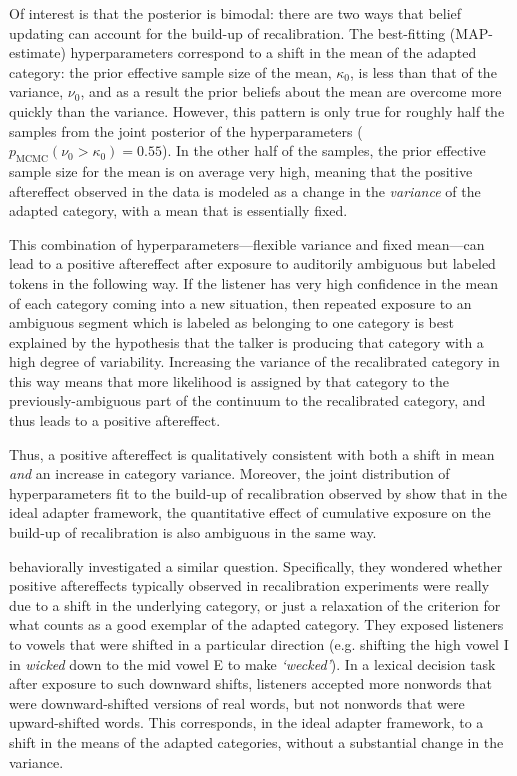 Of interest is that the posterior is bimodal: there are two ways that belief updating can account for the build-up of recalibration.  The best-fitting (MAP-estimate) hyperparameters correspond to a shift in the mean of the adapted category: the prior effective sample size of the mean, $\kappa_0$, is less than that of the variance, $\nu_0$, and as a result the prior beliefs about the mean are overcome more quickly than the variance.
However, this pattern is only true for roughly half the samples from the joint posterior of the hyperparameters ($p_\mathrm{MCMC}(\nu_0 > \kappa_0) = 0.55$).  In the other half of the samples, the prior effective sample size for the mean is on average very high, meaning that the positive aftereffect observed in the data is modeled as a change in the \emph{variance} of the adapted category, with a mean that is essentially fixed.

This combination of hyperparameters---flexible variance and fixed mean---can lead to a positive aftereffect after exposure to auditorily ambiguous but labeled tokens in the following way.  If the listener has very high confidence in the mean of each category coming into a new situation, then repeated exposure to an ambiguous segment which is labeled as belonging to one category is best explained by the hypothesis that the talker is producing that category with a high degree of variability.  Increasing the variance of the recalibrated category in this way means that more likelihood is assigned by that category to the previously-ambiguous part of the continuum to the recalibrated category, and thus leads to a positive aftereffect.

Thus, a positive aftereffect is qualitatively consistent with both a shift in mean \emph{and} an increase in category variance.  Moreover, the joint distribution of hyperparameters fit to the build-up of recalibration observed by \textcite{Vroomen2007} show that in the ideal adapter framework, the quantitative effect of cumulative exposure on the build-up of recalibration is also ambiguous in the same way.

\textcite{Maye2008a} behaviorally investigated a similar question.  Specifically, they wondered whether positive aftereffects typically observed in recalibration experiments were really due to a shift in the underlying category, or just a relaxation of the criterion for what counts as a good exemplar of the adapted category.  They exposed listeners to vowels that were shifted in a particular direction (e.g. shifting the high vowel \ph I in \emph{wicked} down to the mid vowel \ph E to make \emph{`wecked'}).  In a lexical decision task after exposure to such downward shifts, listeners accepted more nonwords that were downward-shifted versions of real words, but not nonwords that were upward-shifted words.  This corresponds, in the ideal adapter framework, to a shift in the means of the adapted categories, without a substantial change in the variance.

